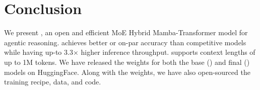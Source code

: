\section{Conclusion}
We present \ourmodel, an open and efficient MoE Hybrid Mamba-Transformer model for agentic reasoning. \ourmodel achieves better or on-par accuracy than competitive models while having up-to 3.3$\times$ higher inference throughput. \ourmodel supports context lengths of up to 1M tokens. We have released the weights for both the base (\ourbasemodel) and final (\ourfinalmodel) models on HuggingFace. Along with the weights, we have also open-sourced the training recipe, data, and code.
\label{sec:conclusion}
